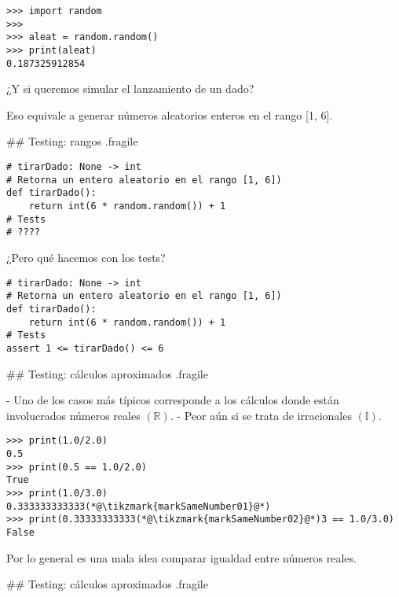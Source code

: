 \begin{lstlisting}
>>> import random
>>>
>>> aleat = random.random()
>>> print(aleat)
0.187325912854
\end{lstlisting}

\bgnblockgood
¿Y si queremos simular el lanzamiento de un dado?

Eso equivale a
generar números aleatorios enteros en el rango [1, 6].
\trmblockgood

## Testing: rangos {.fragile}

\begin{lstlisting}[style=frame02]
# tirarDado: None -> int
# Retorna un entero aleatorio en el rango [1, 6])
def tirarDado():
    return int(6 * random.random()) + 1
# Tests
# ????
\end{lstlisting}

\pause

\bgnblockdanger
¿Pero qué hacemos con los tests?
\trmblockdanger

\pause

\begin{lstlisting}[style=frame02]
# tirarDado: None -> int
# Retorna un entero aleatorio en el rango [1, 6])
def tirarDado():
    return int(6 * random.random()) + 1
# Tests
assert 1 <= tirarDado() <= 6
\end{lstlisting}

## Testing: cálculos aproximados {.fragile}


- Uno de los casos más típicos corresponde a los cálculos donde están involucrados números reales $(\mathbb{R})$.
    - Peor aún si se trata de irracionales $(\mathbb{I})$.

\begin{lstlisting}
>>> print(1.0/2.0)
0.5
>>> print(0.5 == 1.0/2.0)
True
>>> print(1.0/3.0)
0.333333333333(*@\tikzmark{markSameNumber01}@*)
>>> print(0.33333333333(*@\tikzmark{markSameNumber02}@*)3 == 1.0/3.0)
False
\end{lstlisting}

\pause

\bgnblockidea
Por lo general es una mala idea comparar igualdad entre números reales.
\trmblockidea


## Testing: cálculos aproximados {.fragile}

